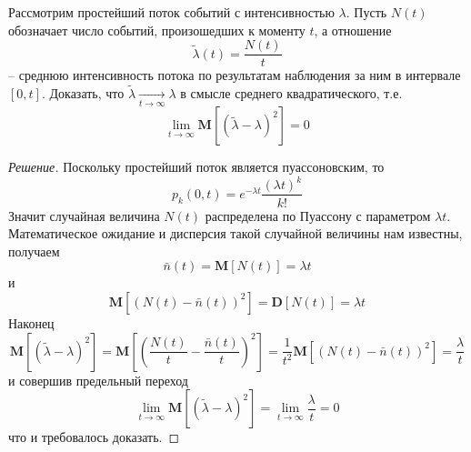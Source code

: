 \documentclass[12pt,a4paper]{article}
\author{Самутичев Е.Р.}
\date{\today}
\title{}
\begin{document}
	
\maketitle

\begin{exercise}[Задача 3]
	Рассмотрим простейший поток событий с интенсивностью $\lambda$. Пусть $N(t)$ обозначает число событий, произошедших к моменту $t$, а отношение 
	$$\tilde{\lambda}(t) = \frac{N(t)}{t}$$
	-- среднюю интенсивность потока по результатам наблюдения за ним в интервале $[0, t]$. Доказать, что $\tilde{\lambda} \underset{t\to\infty}{\to} \lambda$ в смысле среднего квадратического, т.е.
	$$\lim_{t\to\infty}{\textbf{M}[(\tilde{\lambda} - \lambda)^2]} = 0$$
\end{exercise}
\begin{proof}[Решение]
	Поскольку простейший поток является пуассоновским, то
	$$p_k (0, t) = e^{-\lambda t} \frac{(\lambda t)^k}{k!}$$ 
	Значит случайная величина $N(t)$ распределена по Пуассону с параметром $\lambda t$. Математическое ожидание и дисперсия такой случайной величины нам известны, получаем
	$$\bar{n}(t) = \textbf{M}[N(t)] = \lambda t$$
	и
	$$\textbf{M}[(N(t) - \bar{n}(t))^2] = \textbf{D}[N(t)] = \lambda t$$
	Наконец
	$$\textbf{M}[(\tilde{\lambda} - \lambda)^2] = \textbf{M}\left[\left(\frac{N(t)}{t} - \frac{\bar{n}(t)}{t}\right)^2\right] = \frac{1}{t^2} \textbf{M}[(N(t) - \bar{n}(t))^2] = \frac{\lambda}{t}$$
	и совершив предельный переход
	$$\lim_{t \to \infty}{\textbf{M}[(\tilde{\lambda} - \lambda)^2]} = \lim_{t \to \infty}{\frac{\lambda}{t}} = 0$$
	что и требовалось доказать.
\end{proof}
\end{document}
